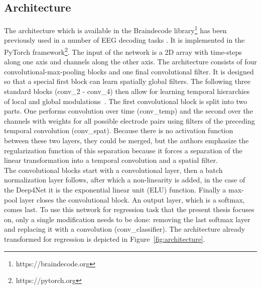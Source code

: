\subsection{Architecture}\label{subsec:architecture}
The architecture which is available in the Braindecode library\footnote{https://braindecode.org} has been previously used in a number of EEG decoding tasks \cite{Hammer-2021, schirrmeister-deep-2017, hartmann-hierarchical-2018}.
It is implemented in the PyTorch framework\footnote{https://pytorch.org}.
The input of the network is a 2D array with time-steps along one axis and channels along the other axis.
The architecture consists of four convolutional-max-pooling blocks and one final convolutional filter.
It is designed so that a special first block can learn spatially global filters.
The following three standard blocks (conv\_2 - conv\_4) then allow for learning temporal hierarchies of local and global modulations~\cite{schirrmeister-deep-2017}.
The first convolutional block is split into two parts.
One performs convolution over time (conv\_temp) and the second over the channels with weights for all possible electrode pairs using filters of the preceding temporal convolution (conv\_spat).
Because there is no activation function between these two layers, they could be merged, but the authors emphasize the regularization function of this separation because it forces a separation of the linear transformation into a temporal convolution and a spatial filter. \\

The convolutional blocks start with a convolutional layer, then a batch normalization layer follows, after which a non-linearity is added, in the case of the Deep4Net it is the exponential linear unit (ELU) function\cite{clevert-elu-2016}.
Finally a max-pool layer closes the convolutional block.
An output layer, which is a softmax, comes last.
To use this network for regression task that the present thesis focuses on, only a single modification needs to be done: removing the last softmax layer and replacing it with a convolution (conv\_classifier).
The architecture already transformed for regression is depicted in Figure~\ref{fig:architecture}. \\

